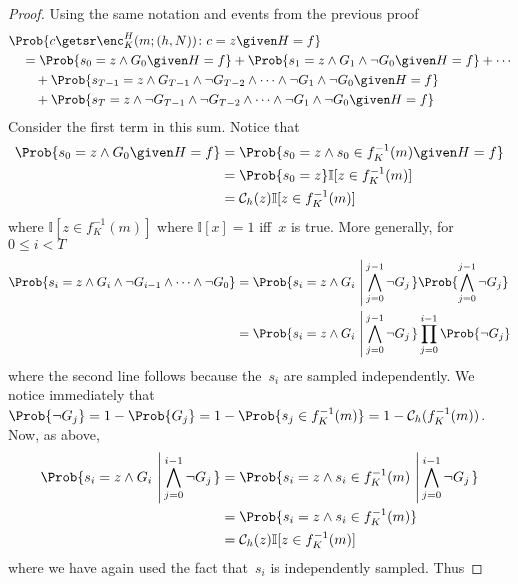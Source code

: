 \begin{proof}
Using the same notation and events from the previous proof
\begin{align}
&\Prob{c\getsr\enc^H_K(m;(h,N)) \colon c=z \given H=f} \nonumber\\
&\quad=\Prob{s_0=z \wedge G_0 \given H=f} + \Prob{s_1=z \wedge G_1 \wedge  \neg G_0 \given H=f} + \cdots \nonumber\\
&\quad\quad+ \Prob{s_{T-1}=z \wedge  G_{T-1} \wedge \neg G_{T-2} \wedge \cdots  \wedge \neg G_1 \wedge \neg G_0 \given H=f}\nonumber\\
&\quad\quad + \Prob{s_T=z \wedge \neg G_{T-1} \wedge \neg G_{T-2}
  \wedge \cdots \wedge \neg G_1 \wedge \neg G_0 \given H=f} \label{eq:main}
\end{align}
Consider the first term in this sum.  Notice that 
\begin{align*}
\Prob{s_0 = z \wedge G_0 \given H=f} 
&=\Prob{s_0=z \wedge s_0 \in f^{-1}_K(m) \given H=f}\\
&=\Prob{s_0=z}\mathbb{I}[z \in f^{-1}_K(m)]\\
&=\mathcal{C}_h(z) \mathbb{I}[z \in f^{-1}_K(m)]
\end{align*}
where
$\mathbb{I}[z \in f^{-1}_K(m)]$ where $\mathbb{I}[x]=1$ iff~$x$ is true.  
More generally, for $0 \leq i < T$
\begin{align*}
\Prob{s_i=z \wedge G_i \wedge \neg G_{i-1} \wedge \cdots \wedge \neg G_0} &=
\Prob{s_i=z \wedge G_i \, \left| \, \bigwedge_{j=0}^{j-1} \neg G_j \right.} \Prob{\bigwedge_{j=0}^{j-1} \neg G_j}\\
&=\Prob{s_i=z \wedge G_i \, \left| \, \bigwedge_{j=0}^{j-1} \neg G_j \right.} \prod_{j=0}^{i-1} \Prob{\neg G_j}
\end{align*}
where the second line follows because the~$s_i$ are sampled independently.  We notice immediately that $\Prob{\neg G_j} = 1 - \Prob{G_j} = 1-\Prob{s_j \in f^{-1}_K(m)} = 1 - \mathcal{C}_h(f^{-1}_K(m))$.  Now, as above, 
\begin{align*}
\Prob{s_i = z \wedge G_i \,\left|\, \bigwedge_{j=0}^{i-1}\neg G_j \right.} 
&= \Prob{s_i = z \wedge s_i \in f^{-1}_K(m) \,\left|\, \bigwedge_{j=0}^{i-1}\neg G_j \right.} \\
&= \Prob{s_i = z \wedge s_i \in f^{-1}_K(m) }\\
&= \mathcal{C}_h(z)\mathbb{I}[z \in f^{-1}_K(m)]
\end{align*}
where we have again used the fact that~$s_i$ is independently sampled.  Thus

\end{proof}
